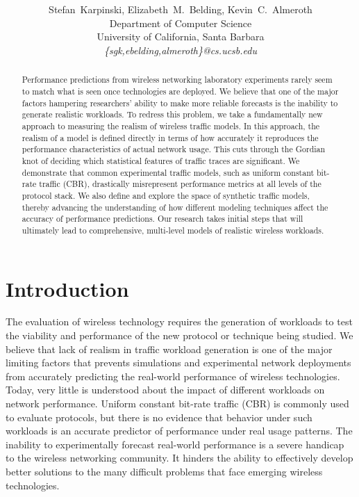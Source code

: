 \documentclass[conference]{IEEEtran}
\title{
\vspace{-0.25em}
\thetitle
}
\author{
{\large{Stefan~Karpinski, Elizabeth~M.~Belding, Kevin~C.~Almeroth}} \vspace{0.25em}\\
Department of Computer Science \\
University of California, Santa Barbara \vspace{0.35em}\\
\textit{\{sgk,ebelding,almeroth\}@cs.ucsb.edu}
}
\newcommand{\caps}[1]{{\small{#1}}}
\begin{document}
\maketitle

\begin{abstract}
Performance predictions from wireless networking laboratory experiments rarely seem to match what is seen once technologies are deployed. We believe that one of the major factors hampering researchers' ability to make more reliable forecasts is the inability to generate realistic workloads. To redress this problem, we take a fundamentally new approach to measuring the realism of wireless traffic models. In this approach, the realism of a model is defined directly in terms of how accurately it reproduces the performance characteristics of actual network usage. This cuts through the Gordian knot of deciding which statistical features of traffic traces are significant. We demonstrate that common experimental traffic models, such as uniform constant bit-rate traffic ({\footnotesize{CBR}}), drastically misrepresent performance metrics at all levels of the protocol stack. We also define and explore the space of synthetic traffic models, thereby advancing the understanding of how different modeling techniques affect the accuracy of performance predictions. Our research takes initial steps that will ultimately lead to comprehensive, multi-level models of realistic wireless workloads.
\end{abstract}

\section{Introduction}\label{sec:intro}

The evaluation of wireless technology requires the generation of workloads to test the viability and performance of the new protocol or technique being studied. We believe that lack of realism in traffic workload generation is one of the major limiting factors that prevents simulations and experimental network deployments from accurately predicting the real-world performance of wireless technologies. Today, very little is understood about the impact of different workloads on network performance. Uniform constant bit-rate traffic (\caps{CBR}) is commonly used to evaluate protocols, but there is no evidence that behavior under such workloads is an accurate predictor of performance under real usage patterns. The inability to experimentally forecast real-world performance is a severe handicap to the wireless networking community. It hinders the ability to effectively develop better solutions to the many difficult problems that face emerging wireless technologies.
\end{document}
